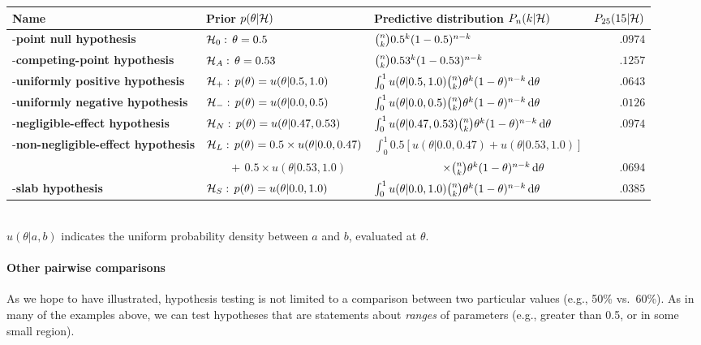 \begin{tcolorbox}[title=Box~2: Model definitions and equations,code={\singlespacing}]
\tiny\centering\begin{tabular}{lllr}\hline
Name & Prior $p(\theta|{\mathcal{H}})$  & Predictive distribution $P_n(k|{\mathcal{H}})$&$P_{25}(15|{\mathcal{H}})$\\[1ex]\hline
\hyp{\textbf{point null hypothesis}} 
		& ${\mathcal{H}}_0:\,\theta = 0.5$                        
		& $\binom{n}{k} 0.5^k (1-0.5)^{n-k}$ 
		& $.0974$
		\\[1ex]
\hyp{\textbf{competing-point hypothesis}}
		& ${\mathcal{H}}_A:\,\theta = 0.53$
		& $\binom{n}{k} 0.53^k (1-0.53)^{n-k}$ 
		& $.1257$
		\\[1ex]
\hyp{\textbf{uniformly positive hypothesis}}
		& ${\mathcal{H}}_+:\,p(\theta) = u(\theta|0.5, 1.0)$            
		& $\int_0^1 u(\theta|0.5, 1.0) \binom{n}{k} \theta^k (1-\theta)^{n-k} \mathop{}\!\mathrm{d}\theta$ 
		& $.0643$
		\\[1ex]
\hyp{\textbf{uniformly negative hypothesis}}
		& ${\mathcal{H}}_-:\,p(\theta) = u(\theta|0.0, 0.5)$
		& $\int_0^1 u(\theta|0.0, 0.5) \binom{n}{k} \theta^k (1-\theta)^{n-k} \mathop{}\!\mathrm{d}\theta$
		& $.0126$
		\\[1ex]
\hyp{\textbf{negligible-effect hypothesis}} 
		& ${\mathcal{H}}_N:\,p(\theta) = u(\theta|0.47, 0.53)$ 
		& $\int_0^1 u(\theta|0.47, 0.53) \binom{n}{k} \theta^k (1-\theta)^{n-k} \mathop{}\!\mathrm{d}\theta$
		& $.0974$
		\\[1ex]
\hyp{\textbf{non-negligible-effect hypothesis}}
		& ${\mathcal{H}}_L:\,p(\theta) = 0.5 \times u(\theta|0.0, 0.47)$ 
		& $\int_0^1 0.5\left[u(\theta|0.0, 0.47) + u(\theta|0.53, 1.0)\right]$\\
		& $\qquad{+}{\,}0.5 \times u(\theta|0.53, 1.0)$
		& $\qquad\qquad\qquad \times \binom{n}{k} \theta^k (1-\theta)^{n-k} \mathop{}\!\mathrm{d}\theta$ 
		& $.0694$
		\\[1ex]
\hyp{\textbf{slab hypothesis}} 
		& ${\mathcal{H}}_S:\,p(\theta) = u(\theta|0.0, 1.0)$
		& $\int_0^1 u(\theta|0.0, 1.0) \binom{n}{k} \theta^k (1-\theta)^{n-k} \mathop{}\!\mathrm{d}\theta$
		& $.0385$
		\\[1ex]\hline
\end{tabular}\\
\indent\flushleft\small $u(\theta|a,b)$ indicates the uniform probability density between $a$ and $b$, evaluated at $\theta$.
\end{tcolorbox}

\paragraph{Other pairwise comparisons} As we hope to have illustrated, hypothesis testing is not limited to a comparison between two particular values (e.g., 50\% vs.\ 60\%).  As in many of the examples above, we can test hypotheses that are statements about \emph{ranges} of parameters (e.g., greater than 0.5, or in some small region).

